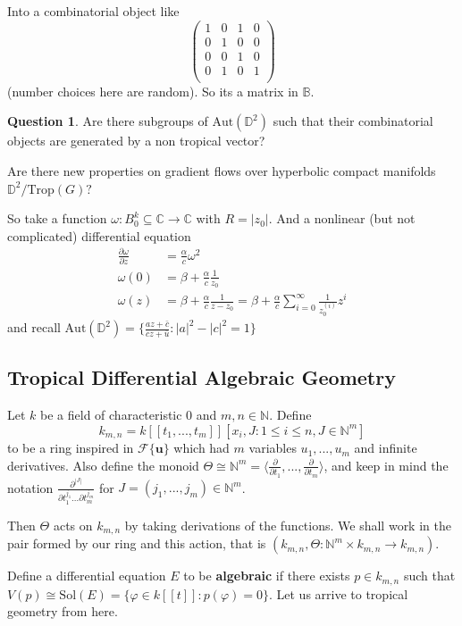 \documentclass{article}
\theoremstyle{definition}
\newtheorem{question}{Question}
\newcommand{\N}{\mathbb{N}}
\newcommand{\C}{\mathbb{C}}
\newcommand{\Sol}{\text{Sol}}
\begin{document}
Into a combinatorial object like 
$$\begin{pmatrix}
1&0 & 1& 0 \\
0& 1 & 0&0\\
0&0 & 1& 0\\
0& 1 & 0& 1 \\
\end{pmatrix}$$
(number choices here are random). So its a matrix in $\mathbb B$.
\begin{question}\leavevmode Are there subgroups of $\text{Aut}(\mathbb{D}^2)$ such that their combinatorial objects are generated by a non tropical vector?\par
    Are there new properties on gradient flows over hyperbolic compact manifolds $\mathbb D^2/\text{Trop}(G)?$
    \end{question}
    So take a function $\omega:B^k_0\subseteq\C\to\C$ with $R=|z_0|$. And a nonlinear (but not complicated) differential equation
    \begin{align*}\frac{\partial \omega}{\partial z}&=\frac{\alpha}{c}\omega^2\\\omega(0)&=\beta+\frac{\alpha}{c}\frac{1}{z_0}\\\omega(z)&=\beta+\frac{\alpha}{c}\frac{1}{z-z_0}=\beta+\frac{\alpha}{c}\sum_{i=0}^\infty\frac{1}{z_0^{(i)}}z^i\end{align*}
    and recall $\text{Aut}(\mathbb D^2)=\{\frac{az+\bar c}{cz+\bar u}:|a|^2-|c|^2=1\}$
\subsection{Tropical Differential Algebraic Geometry}
    Let $k$ be a field of characteristic 0 and $m,n\in\N$. Define $$k_{m,n}=k[[t_1,...,t_m]][x_i,J:1\leq i\leq n, J\in\N^m]$$ to be a ring inspired in $\mathcal F\{\mathbf{u}\}$ which had $m$ variables $u_1,...,u_m$ and infinite derivatives. Also define the monoid $\Theta\cong\N^m=\langle \frac{\partial}{\partial t_1},...,\frac{\partial}{\partial t_m}\rangle$, and keep in mind the notation $\frac{\partial^{|J|}}{\partial t_1^{j_1}...\partial t_m^{j_m}}$ for $J=(j_1,...,j_m)\in\N^m$.\par
    Then $\Theta$ acts on $k_{m,n}$ by taking derivations of the functions. We shall work in the pair formed by our ring and this action, that is $(k_{m,n},\Theta:\N^m\times k_{m,n}\to k_{m,n})$.\par
    Define a differential equation $E$ to be \textbf{algebraic} if there exists $p\in k_{m,n}$ such that $V(p)\cong \Sol(E)=\{\varphi\in k[[t]]:p(\varphi)=0\}$. Let us arrive to tropical geometry from here.
\end{document}
